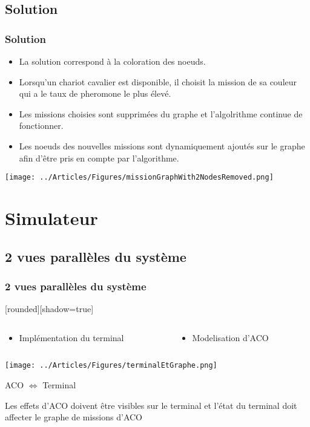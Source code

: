 \documentclass{beamer}
\begin{document}
\subsection*{Solution}
\begin{frame}
\frametitle{Solution}

	\begin{itemize}
	  \item La solution correspond à la coloration des noeuds.
	  \item Lorsqu'un chariot cavalier est disponible, il choisit la mission de sa couleur qui a le taux de pheromone le plus élevé.
	  \item Les missions choisies sont supprimées du graphe et l'algolrithme continue de fonctionner.
	  \item Les noeuds des nouvelles missions sont dynamiquement ajoutés sur le graphe afin d'être pris en compte par l'algorithme.
	\end{itemize}
	
	\begin{center}
		\texttt{[image: ../Articles/Figures/missionGraphWith2NodesRemoved.png]}
	\end{center}
\end{frame}

\section{Simulateur}
\subsection*{2 vues parallèles du système}
\begin{frame}
\frametitle{2 vues parallèles du système}
	[rounded][shadow=true]
 	\begin{columns}
	 	\begin{column}[l]{6cm}
	 		\begin{itemize}
				 \item Implémentation du terminal
			\end{itemize}
		\end{column}
		\begin{column}[r]{6cm}
			\begin{itemize}
				  \item Modelisation d'ACO\cite{Dutot2007}
			\end{itemize}
		\end{column}
 	\end{columns}
	\begin{center} \texttt{[image: ../Articles/Figures/terminalEtGraphe.png]} \end{center}

	\begin{block}{ACO $\Longleftrightarrow$ Terminal}
		\begin{center}
			Les effets d'ACO doivent être visibles sur le terminal et l'état du terminal doit affecter le graphe de missions d'ACO
	 	\end{center}
	\end{block}
\end{frame}
\end{document}
